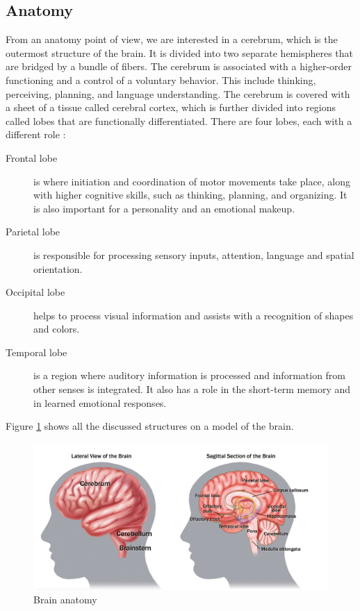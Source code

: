 \subsection{Anatomy}
From an anatomy point of view, we are interested in a cerebrum, which is the
outermost structure of the brain. It is divided into two separate hemispheres that are
bridged by a bundle of fibers. The cerebrum is associated with a higher-order
functioning and a control of a voluntary behavior. This include thinking,
perceiving, planning, and language understanding. The cerebrum is covered with a
sheet of a tissue called cerebral cortex, which is further divided into regions called lobes
that are functionally differentiated. There are four lobes,
each with a different role \cite{brainFacts}: 
\begin{description}
	\item[Frontal lobe] is where initiation and coordination
	of motor movements take place, along with higher cognitive skills, such as
	thinking, planning, and organizing. It is also important for a personality and
	an emotional makeup.
	\item[Parietal lobe] is responsible for processing sensory
	inputs, attention, language and spatial orientation.
	\item[Occipital lobe]  helps to	process visual information and assists with a recognition of shapes and colors.
	\item[Temporal lobe] is a region where auditory information is processed and
	information from other senses is integrated. It also has a role in the
	short-term memory and in learned emotional responses.
\end{description}
Figure \ref{fig:brainAnatomy} shows all the discussed structures on a model of the brain.

\begin{figure}[htb]
	\centering
	\includegraphics[width=1\linewidth]{fig/BrainAnatomy.jpg}
	\caption[Caption for LOF]{Brain anatomy\protect\footnotemark}
	\label{fig:brainAnatomy}
\end{figure}

